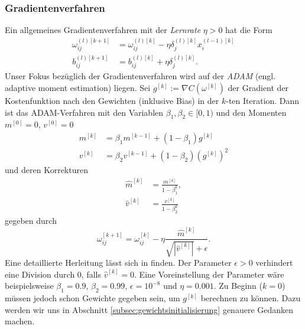 \subsubsection{Gradientenverfahren}
\label{subsubsec:gradient}
Ein allgemeines Gradientenverfahren mit der \textit{Lernrate} $\eta > 0$ hat die Form
\begin{align*}
    \omega_{ij}^{(l)[k+1]} &= \omega_{ij}^{(l)[k]} - \eta \delta_{j}^{(l)[k]} x_i^{(l-1)[k]}\\
    b_{ij}^{(l)[k+1]} &= b_{ij}^{(l)[k]} + \eta \delta_{j}^{(l)[k]}.
\end{align*}
Unser Fokus bezüglich der Gradientenverfahren wird auf der \textit{ADAM} (engl. adaptive moment estimation) liegen. Sei
$g^{[k]} := \nabla C(\omega^{[k]})$ der Gradient der Kostenfunktion nach den Gewichten (inklusive Bias) in der $k$-ten
Iteration. Dann ist das ADAM-Verfahren mit den Variablen $\beta_1,\beta_2 \in [0,1)$ und den Momenten $m^{[0]}=0$,
$v^{[0]}=0$
\begin{align*}
    m^{[k]} &= \beta_1 m^{[k-1]} + (1-\beta_1)g^{[k]} \\
    v^{[k]} &= \beta_2 v^{[k-1]} + (1-\beta_2)(g^{[k]})^2
\end{align*}
und deren Korrekturen
\begin{align*}
    \hat{m}^{[k]} &= \frac{m^{[k]}}{1-\beta_1^k}, \\
    \hat{v}^{[k]} &= \frac{v^{[k]}}{1-\beta_2^k}
\end{align*}
gegeben durch
\[
    \omega_{ij}^{[k+1]}= \omega_{ij}^{[k]} - \eta \frac{\hat{m}^{[k]}}{\sqrt{|\hat{v}^{[k]}|} + \epsilon}.
\]
Eine detaillierte Herleitung lässt sich in \cite[103-104]{calinDeepLearningArchitectures2020} finden.
Der Parameter $\epsilon > 0$ verhindert eine Division durch $0$, falls $\hat{v}^{[k]} = 0$. Eine
Voreinstellung der Parameter wäre beispielsweise $\beta_1=0.9$, $\beta_2=0.99$, $\epsilon=10^{-8}$ und $\eta = 0.001$. Zu Beginn ($k=0$)
müssen jedoch schon Gewichte gegeben sein, um $g^{[k]}$ berechnen zu können. Dazu werden wir uns in
Abschnitt \ref{subsec:gewichtsinitialisierung} genauere Gedanken machen.

